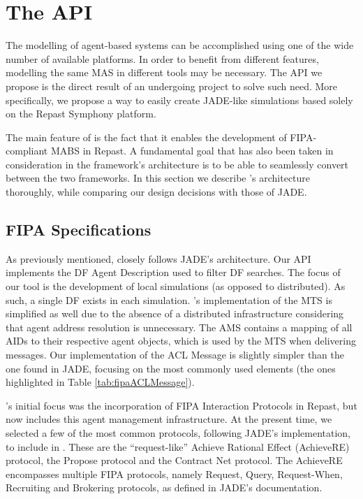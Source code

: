 \section{The \apiname{} API} %
\label{sec:proposal}

The modelling of agent-based systems can be accomplished using one of the wide number of available platforms. In order to benefit from different features, modelling the same MAS in different tools may be necessary.
The API we propose is the direct result of an undergoing project to solve such need. More specifically, we propose a way to easily create JADE-like simulations based solely on the Repast Symphony platform.

The main feature of \apiname{} is the fact that it enables the development of FIPA-compliant MABS in Repast.
A fundamental goal that has also been taken in consideration in the framework's architecture is to be able to seamlessly convert between the two frameworks.
In this section we describe \apiname{}'s architecture thoroughly, while comparing our design decisions with those of JADE.


\subsection{\gls{FIPA} Specifications}

As previously mentioned, \apiname{} closely follows JADE's architecture.
Our API implements the DF Agent Description used to filter DF searches. The focus of our tool is the development of local simulations (as opposed to distributed). As such, a single DF exists in each simulation. \apiname{}'s implementation of the MTS is simplified as well due to the absence of a distributed infrastructure considering that agent address resolution is unnecessary. The AMS contains a mapping of all AIDs to their respective agent objects, which is used by the MTS when delivering messages.
Our implementation of the ACL Message is slightly simpler than the one found in JADE, focusing on the most commonly used elements (the ones highlighted in Table \ref{tab:fipaACLMessage}).

\apiname{}'s initial focus was the incorporation of \gls{FIPA} Interaction Protocols in Repast, but now includes this agent management infrastructure. At the present time, we selected a few of the most common protocols, following JADE's implementation, to include in \apiname{}.
These are the ``request-like'' Achieve Rational Effect (AchieveRE) protocol, the Propose protocol and the Contract Net protocol. The AchieveRE encompasses multiple \gls{FIPA} protocols, namely Request, Query, Request-When, Recruiting and Brokering protocols, as defined in JADE's documentation.


